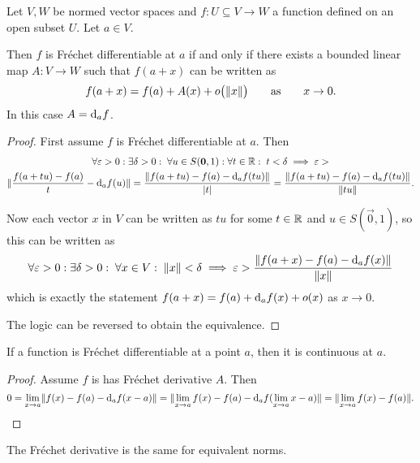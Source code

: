\begin{proposition} \label{FrechetDerivativeAsymptotics}
Let $V,W$ be normed vector spaces and $f:U\subseteq V\to W$ a function defined on an open subset $U$. Let $a\in V$.

Then $f$ is Fréchet differentiable at $a$ \textup{if and only if} there exists a bounded linear map $A: V\to W$ such that $f(a+x)$ can be written as
\[ f(a+x) = f(a) + A(x) + o\big(\lVert x\rVert\big) \qquad \text{as} \qquad x\to 0. \]
In this case $A = \operatorname{d \!}{_af}$.
\end{proposition}
\begin{proof}
First assume $f$ is Fréchet differentiable at $a$. Then
\begin{multline*}
\forall \varepsilon>0:\exists \delta>0: \; \forall u\in S(\boldsymbol{\mathrm{0}},1): \forall t\in\mathbb{R}: \; t< \delta \implies \varepsilon > \\ \lVert\frac{f(a+tu) - f(a)}{t} - \operatorname{d \!}{_af}(u)\rVert = \frac{\lVert f(a+tu) - f(a)- \operatorname{d \!}{_af}(tu)\rVert}{|t|} = \frac{\lVert f(a+tu) - f(a)- \operatorname{d \!}{_af}(tu)\rVert}{\lVert tu\rVert}.
\end{multline*}

Now each vector $x$ in $V$ can be written as $tu$ for some $t\in\mathbb{R}$ and $u\in S(\vec{0},1)$, so this can be written as
\[ \forall \varepsilon>0:\exists \delta>0: \; \forall x\in V: \; \lVert x\rVert< \delta \implies  \varepsilon > \frac{\lVert f(a+x) - f(a)- \operatorname{d \!}{_af}(x)\rVert}{\lVert x\rVert} \]
which is exactly the statement $f(a+x) = f(a) + \operatorname{d \!}{_af}(x) + o(x)$ as $x\to 0$.

The logic can be reversed to obtain the equivalence.
\end{proof}

\begin{proposition}
If a function is Fréchet differentiable at a point $a$, then it is continuous at $a$.
\end{proposition}
\begin{proof}
Assume $f$ is has Fréchet derivative $A$. Then
\[ 0 = \lim_{x\to a} \lVert f(x) - f(a) - \operatorname{d \!}{_af}(x-a)\rVert = \lVert\lim_{x\to a}f(x) - f(a) - \operatorname{d \!}{_af}(\lim_{x\to a} x-a)\rVert = \lVert\lim_{x\to a}f(x) - f(a)\rVert. \]
\end{proof}

\begin{lemma}
The Fréchet derivative is the same for equivalent norms.
\end{lemma}

